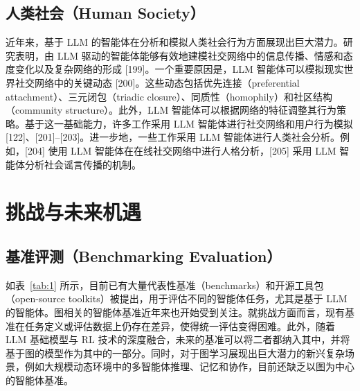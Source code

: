 \documentclass[10pt,UTF8,fontset=fandol]{ctexart}
\begin{document}
\subsection{人类社会（Human Society）}

近年来，基于 LLM 的智能体在分析和模拟人类社会行为方面展现出巨大潜力。研究表明，由 LLM 驱动的智能体能够有效地建模社交网络中的信息传播、情感和态度变化以及复杂网络的形成 [199]。一个重要原因是，LLM 智能体可以模拟现实世界社交网络中的关键动态 [200]。这些动态包括优先连接（preferential attachment）、三元闭包（triadic closure）、同质性（homophily）和社区结构（community structure）。此外，LLM 智能体可以根据网络的特征调整其行为策略。基于这一基础能力，许多工作采用 LLM 智能体进行社交网络和用户行为模拟 [122]、[201]--[203]。进一步地，一些工作采用 LLM 智能体进行人类社会分析。例如，[204] 使用 LLM 智能体在在线社交网络中进行人格分析，[205] 采用 LLM 智能体分析社会谣言传播的机制。

\section{挑战与未来机遇}

\subsection{基准评测（Benchmarking Evaluation）}

如表~\ref{tab:1} 所示，目前已有大量代表性基准（benchmarks）和开源工具包（open-source toolkits）被提出，用于评估不同的智能体任务，尤其是基于 LLM 的智能体。图相关的智能体基准近年来也开始受到关注。就挑战方面而言，现有基准在任务定义或评估数据上仍存在差异，使得统一评估变得困难。此外，随着 LLM 基础模型与 RL 技术的深度融合，未来的基准可以将二者都纳入其中，并将基于图的模型作为其中的一部分。同时，对于图学习展现出巨大潜力的新兴复杂场景，例如大规模动态环境中的多智能体推理、记忆和协作，目前还缺乏以图为中心的智能体基准。
\end{document}
